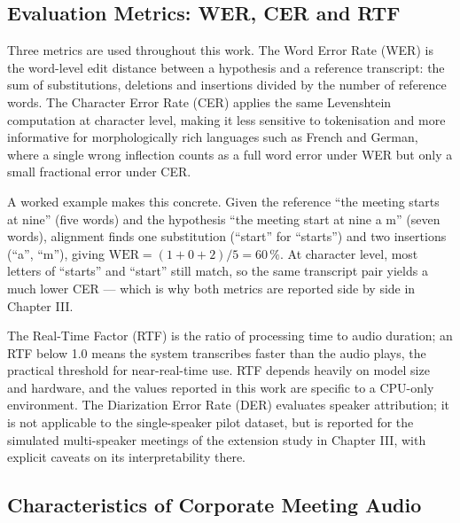 \documentclass[12pt]{report}
\begin{document}
\subsection{Evaluation Metrics: WER, CER and RTF}

Three metrics are used throughout this work. The Word Error Rate (WER) is the word-level edit distance between a hypothesis and a reference transcript: the sum of substitutions, deletions and insertions divided by the number of reference words. The Character Error Rate (CER) applies the same Levenshtein computation at character level, making it less sensitive to tokenisation and more informative for morphologically rich languages such as French and German, where a single wrong inflection counts as a full word error under WER but only a small fractional error under CER.

A worked example makes this concrete. Given the reference \enquote{the meeting starts at nine} (five words) and the hypothesis \enquote{the meeting start at nine a m} (seven words), alignment finds one substitution (\enquote{start} for \enquote{starts}) and two insertions (\enquote{a}, \enquote{m}), giving $\mathrm{WER} = (1+0+2)/5 = 60\,\%$. At character level, most letters of \enquote{starts} and \enquote{start} still match, so the same transcript pair yields a much lower CER --- which is why both metrics are reported side by side in Chapter III.

The Real-Time Factor (RTF) is the ratio of processing time to audio duration; an RTF below 1.0 means the system transcribes faster than the audio plays, the practical threshold for near-real-time use. RTF depends heavily on model size and hardware, and the values reported in this work are specific to a CPU-only environment. The Diarization Error Rate (DER) evaluates speaker attribution; it is not applicable to the single-speaker pilot dataset, but is reported for the simulated multi-speaker meetings of the extension study in Chapter III, with explicit caveats on its interpretability there.

\subsection{Characteristics of Corporate Meeting Audio}
\end{document}
